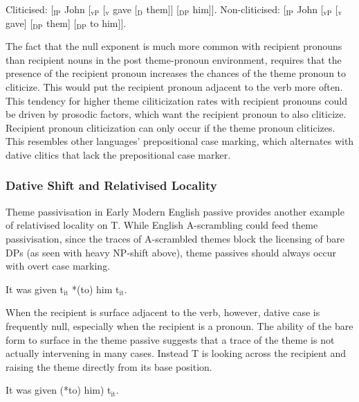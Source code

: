\begin{exe}
\ex 
\begin{xlist}
\ex Cliticised: [$_{\text{IP}}$ John [$_{\text{vP}}$ [$_{\text{v}}$ gave [$_{\text{D}}$ them]] [$_{\text{DP}}$ him]].
\ex Non-cliticised: [$_{\text{IP}}$ John [$_{\text{vP}}$ [$_{\text{v}}$ gave] [$_{\text{DP}}$ them] [$_{\text{DP}}$ to him]].
\end{xlist}
\end{exe}

The fact that the null exponent is much more common with recipient pronouns than recipient nouns in the post theme-pronoun environment, requires that the presence of the recipient pronoun increases the chances of the theme pronoun to cliticize. This would put the recipient pronoun adjacent to the verb more often. This tendency for higher theme ciliticization rates with recipient pronouns could be driven by prosodic factors, which want the recipient pronoun to also cliticize. Recipient pronoun cliticization can only occur if the theme pronoun cliticizes. This resembles other languages' prepositional case marking, which alternates with dative clitics that lack the prepositional case marker.

\subsubsection{Dative Shift and Relativised Locality}\label{sec:shiftloc}
Theme passivisation in Early Modern English passive provides another example of relativised locality on T. While English A-scrambling could feed theme passivisation, since the traces of A-scrambled themes block the licensing of bare DPs (as seen with heavy NP-shift above), theme passives should always occur with overt case marking.

\begin{exe}
\ex It was given t$_{\text{it}}$ *(to) him t$_{\text{it}}$.
\end{exe}

When the recipient is surface adjacent to the verb, however, dative case is frequently null, especially when the recipient is a pronoun. The ability of the bare form to surface in the theme passive suggests that a trace of the theme is not actually intervening in many cases. Instead T is looking across the recipient and raising the theme directly from its base position.

\begin{exe}
\ex It was given (*to) him) t$_{\text{it}}$.
\end{exe}

